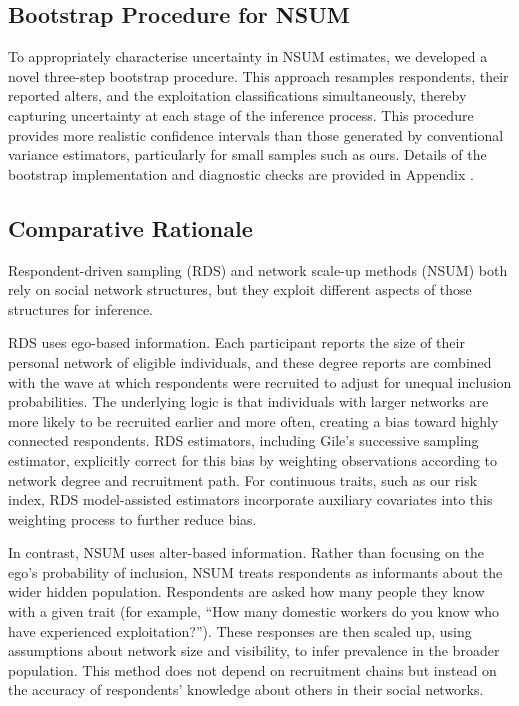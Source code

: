 \documentclass[
  12pt,
  letterpaper,
  DIV=11,
  numbers=noendperiod]{scrartcl}
\theoremstyle{plain}
\theoremstyle{definition}
\begin{document}
\subsection{Bootstrap Procedure for
NSUM}\label{bootstrap-procedure-for-nsum}

To appropriately characterise uncertainty in NSUM estimates, we
developed a novel three-step bootstrap procedure. This approach
resamples respondents, their reported alters, and the exploitation
classifications simultaneously, thereby capturing uncertainty at each
stage of the inference process. This procedure provides more realistic
confidence intervals than those generated by conventional variance
estimators, particularly for small samples such as ours. Details of the
bootstrap implementation and diagnostic checks are provided in Appendix
\textcite{app-3step}.

\subsection{Comparative Rationale}\label{comparative-rationale}

Respondent-driven sampling (RDS) and network scale-up methods (NSUM)
both rely on social network structures, but they exploit different
aspects of those structures for inference.

RDS uses ego-based information. Each participant reports the size of
their personal network of eligible individuals, and these degree reports
are combined with the wave at which respondents were recruited to adjust
for unequal inclusion probabilities. The underlying logic is that
individuals with larger networks are more likely to be recruited earlier
and more often, creating a bias toward highly connected respondents. RDS
estimators, including Gile's successive sampling estimator, explicitly
correct for this bias by weighting observations according to network
degree and recruitment path. For continuous traits, such as our risk
index, RDS model-assisted estimators incorporate auxiliary covariates
into this weighting process to further reduce bias.

In contrast, NSUM uses alter-based information. Rather than focusing on
the ego's probability of inclusion, NSUM treats respondents as
informants about the wider hidden population. Respondents are asked how
many people they know with a given trait (for example, ``How many
domestic workers do you know who have experienced exploitation?'').
These responses are then scaled up, using assumptions about network size
and visibility, to infer prevalence in the broader population. This
method does not depend on recruitment chains but instead on the accuracy
of respondents' knowledge about others in their social networks.
\end{document}
